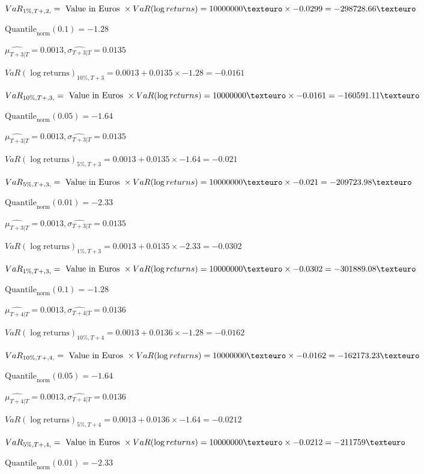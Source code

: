 $VaR_{1\%, T + ,2,} = \text{ Value in Euros } \times VaR(\log returns) = 10 000 000 \texteuro \times-0.0299 = -298728.66 \texteuro$


$\text{Quantile}_\text{norm}(0.1) = -1.28$

$\hat{\mu_{T+3|T}} = 0.0013, \hat{\sigma_{T+3|T}} = 0.0135$

$VaR(\log \text{returns})_{10\%, T + 3} = 0.0013 + 0.0135\times-1.28 = -0.0161$

$VaR_{10\%, T + ,3,} = \text{ Value in Euros } \times VaR(\log returns) = 10 000 000 \texteuro \times-0.0161 = -160591.11 \texteuro$


$\text{Quantile}_\text{norm}(0.05) = -1.64$

$\hat{\mu_{T+3|T}} = 0.0013, \hat{\sigma_{T+3|T}} = 0.0135$

$VaR(\log \text{returns})_{5\%, T + 3} = 0.0013 + 0.0135\times-1.64 = -0.021$

$VaR_{5\%, T + ,3,} = \text{ Value in Euros } \times VaR(\log returns) = 10 000 000 \texteuro \times-0.021 = -209723.98 \texteuro$


$\text{Quantile}_\text{norm}(0.01) = -2.33$

$\hat{\mu_{T+3|T}} = 0.0013, \hat{\sigma_{T+3|T}} = 0.0135$

$VaR(\log \text{returns})_{1\%, T + 3} = 0.0013 + 0.0135\times-2.33 = -0.0302$

$VaR_{1\%, T + ,3,} = \text{ Value in Euros } \times VaR(\log returns) = 10 000 000 \texteuro \times-0.0302 = -301889.08 \texteuro$


$\text{Quantile}_\text{norm}(0.1) = -1.28$

$\hat{\mu_{T+4|T}} = 0.0013, \hat{\sigma_{T+4|T}} = 0.0136$

$VaR(\log \text{returns})_{10\%, T + 4} = 0.0013 + 0.0136\times-1.28 = -0.0162$

$VaR_{10\%, T + ,4,} = \text{ Value in Euros } \times VaR(\log returns) = 10 000 000 \texteuro \times-0.0162 = -162173.23 \texteuro$


$\text{Quantile}_\text{norm}(0.05) = -1.64$

$\hat{\mu_{T+4|T}} = 0.0013, \hat{\sigma_{T+4|T}} = 0.0136$

$VaR(\log \text{returns})_{5\%, T + 4} = 0.0013 + 0.0136\times-1.64 = -0.0212$

$VaR_{5\%, T + ,4,} = \text{ Value in Euros } \times VaR(\log returns) = 10 000 000 \texteuro \times-0.0212 = -211759 \texteuro$


$\text{Quantile}_\text{norm}(0.01) = -2.33$

